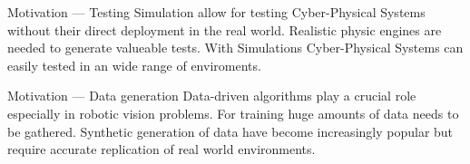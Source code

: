 \documentclass[11pt,t,usepdftitle=false,aspectratio=169]{beamer}
\begin{document}
\begin{frame}{Motivation --- Testing}
   Simulation allow for testing Cyber-Physical Systems without their direct deployment in the real world.
   \bigbreak
   Realistic physic engines are needed to generate valueable tests.
   \bigbreak
   With Simulations Cyber-Physical Systems can easily tested in an wide range of enviroments.
\end{frame}

\begin{frame}{Motivation --- Data generation}
   Data-driven algorithms play a crucial role especially in robotic vision problems.
   For training huge amounts of data needs to be gathered.
   \bigbreak
   Synthetic generation of data have become increasingly popular but require accurate replication of real world environments.
   
\end{frame}
\end{document}
